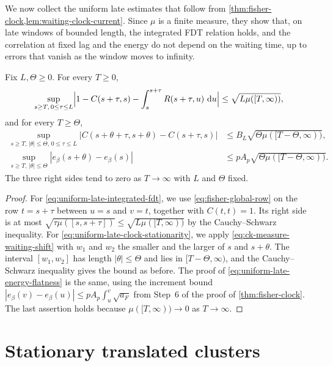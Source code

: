 We now collect the uniform late estimates that follow from \cref{thm:fisher-clock,lem:waiting-clock-current}. Since $\mu$ is a finite measure, they show that, on late windows of bounded length, the integrated FDT relation holds, and the correlation at fixed lag and the energy do not depend on the waiting time, up to errors that vanish as the window moves to infinity.

\begin{corollary}\label{cor:uniform-late-estimates}
Fix $L,\Theta\ge0$. For every $T\ge0$,
\begin{equation}
 \sup_{s\ge T,\,0\le\tau\le L}
 \Bigl|1-C(s+\tau,s)-\int_s^{s+\tau}R(s+\tau,u)\,\mathop{}\!\mathrm d u\Bigr|
 \le\sqrt{L\mu([T,\infty))},
 \label{eq:uniform-late-integrated-fdt}
\end{equation}
and for every $T\ge\Theta$,
\begin{align}
 \sup_{s\ge T,\,|\theta|\le\Theta,\,0\le\tau\le L}
 |C(s+\theta+\tau,s+\theta)-C(s+\tau,s)|
 &\le B_L\sqrt{\Theta\mu([T-\Theta,\infty))},
 \label{eq:uniform-late-clock-stationarity}\\
 \sup_{s\ge T,\,|\theta|\le\Theta}|e_\beta(s+\theta)-e_\beta(s)|
 &\le pA_p\sqrt{\Theta\mu([T-\Theta,\infty))}.
 \label{eq:uniform-late-energy-flatness}
\end{align}
The three right sides tend to zero as $T\to\infty$ with $L$ and $\Theta$ fixed.
\end{corollary}

\begin{proof}
For \eqref{eq:uniform-late-integrated-fdt}, we use \eqref{eq:fisher-global-row} on the row $t=s+\tau$ between $u=s$ and $v=t$, together with $C(t,t)=1$. Its right side is at most $\sqrt{\tau\mu([s,s+\tau])}\le\sqrt{L\mu([T,\infty))}$ by the Cauchy--Schwarz inequality. For \eqref{eq:uniform-late-clock-stationarity}, we apply \eqref{eq:ck-measure-waiting-shift} with $w_1$ and $w_2$ the smaller and the larger of $s$ and $s+\theta$. The interval $[w_1,w_2]$ has length $|\theta|\le\Theta$ and lies in $[T-\Theta,\infty)$, and the Cauchy--Schwarz inequality gives the bound as before. The proof of \eqref{eq:uniform-late-energy-flatness} is the same, using the increment bound $|e_\beta(v)-e_\beta(u)|\le pA_p\int_u^v\sqrt{a_F}$ from Step~6 of the proof of \cref{thm:fisher-clock}. The last assertion holds because $\mu([T,\infty))\to0$ as $T\to\infty$.
\end{proof}

\section{Stationary translated clusters}\label{sec:translated-clusters}

